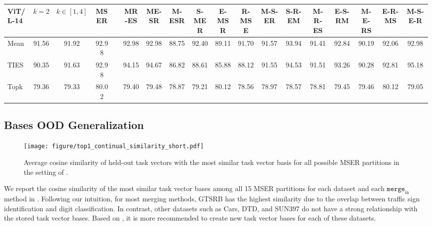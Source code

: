 \begin{table}[!ht]
{\begin{tabular}{@{}lccccccccccccccccc@{}}
ViT/L-14 & $k = 2$    & $k \in [1,4]$   & MSER  & \cellcolor{mygray}{MS-ER} & MR-ES & \multicolumn{1}{c|}{ME-SR} & M-ESR & S-MER & E-MSR & R-MSE & M-S-ER & S-R-EM & M-R-ES & E-S-RM & M-E-RS & E-R-MS & M-S-E-R \\ \midrule
Mean &
  91.56 & 91.92 & 92.98 & \cellcolor{mygray}{\textbf{92.98}} & 92.98 & \multicolumn{1}{c|}{92.98} & 88.75 & 92.40 & 89.11 & 91.70 & 91.57 & 93.94 & 91.41 & 92.84 & 90.19 & 92.06 & 92.98 \\
TIES & 90.35    & 91.63         & 92.98 & \cellcolor{mygray}{\textbf{94.17}} & 94.15 & \multicolumn{1}{c|}{94.67} & 86.82 & 88.61 & 85.88 & 88.12 & 91.55 & 94.53 & 91.51 & 93.26 & 90.28 & 92.81 & 95.18   \\
Topk & 79.36    & 79.33         & 80.02 & \cellcolor{mygray}{\textbf{79.88}} & 79.40 & \multicolumn{1}{c|}{79.48} & 78.87 & 79.21 & 80.12 & 78.56 & 78.97 & 78.57 & 78.81 & 79.45 & 79.46 & 80.12 & 79.05  \\ \bottomrule
\end{tabular}
}
\end{table}


\subsection{Bases OOD Generalization}

\begin{figure}[!ht]
    \centering
\texttt{[image: figure/top1\_continual\_similarity\_short.pdf]}
    \caption{Average cosine similarity of held-out task vectors with the most similar task vector basis for all possible MSER partitions in the setting of .}
    \label{fig:continue_similarity}
\end{figure}

We report the cosine similarity of the most similar task vector bases among all 15 MSER partitions for each dataset and each $\texttt{merge}_\text{in}$ method in . Following our intuition, for most merging methods, GTSRB has the highest similarity due to the overlap between traffic sign identification and digit classification. In contrast, other datasets such as Cars, DTD, and SUN397 do not have a strong relationship with the stored task vector bases. Based on , it is more recommended to create new task vector bases for each of these datasets.

